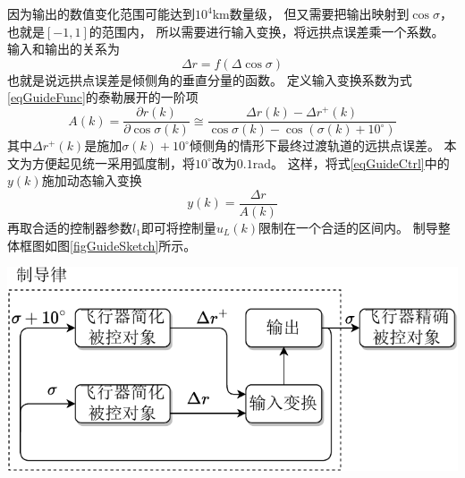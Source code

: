 因为输出的数值变化范围可能达到$10^4$km数量级，
但又需要把输出映射到$\cos\sigma$，也就是$[-1,1]$的范围内，
所以需要进行输入变换，将远拱点误差乘一个系数。
输入和输出的关系为
\begin{equation}
    \Delta r = f(\Delta\cos\sigma) \label{eqGuideFunc}
\end{equation}
也就是说远拱点误差是倾侧角的垂直分量的函数。
定义输入变换系数为式\eqref{eqGuideFunc}的泰勒展开的一阶项
\begin{equation*}
    A(k) = \frac{\partial r(k)}{\partial\cos\sigma(k)}
    \cong \frac{\Delta r(k) - \Delta r^+(k)}{\cos\sigma(k) - \cos(\sigma(k)+10^\circ)}
\end{equation*}
其中$\Delta r^+(k)$是施加$\sigma(k)+10^\circ$倾侧角的情形下最终过渡轨道的远拱点误差。
本文为方便起见统一采用弧度制，将$10^\circ$改为$0.1$rad。
这样，将式\eqref{eqGuideCtrl}中的$y(k)$施加动态输入变换
\[y(k) = \frac{\Delta r}{A(k)}\]
再取合适的控制器参数$l_1$即可将控制量$u_L(k)$限制在一个合适的区间内。
制导整体框图如图\ref{figGuideSketch}所示。
\begin{center}
	\includegraphics[scale=0.7]{GuideSketch.pdf}  \\
	\label{figGuideSketch}
\end{center}

